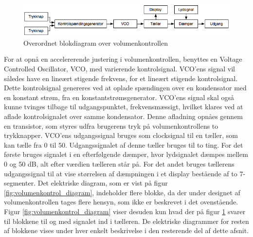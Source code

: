 \begin{figure}[h]
\centering
\includegraphics[scale=0.5]{teknisk/volumenkontrol/blokdiagram-volumenkontrol.png}
\caption{Overordnet blokdiagram over volumenkontrollen}
\label{fig:blokdiagram_volumenkontrol}
\end{figure}

For at opnå en accelererende justering i volumenkontrollen, benyttes en Voltage Controlled Oscillator, VCO, med varierende kontrolsignal. VCO'ens signal vil således have en lineært stigende frekvens, for et lineært stigende kontrolsignal. Dette kontrolsignal genereres ved at oplade spændingen over en kondensator med en konstant strøm, fra en konstantstrømsgenerator. VCO'ens signal skal også kunne tvinges tilbage til udgangspunktet, frekvensmæssigt, hvilket klares ved at aflade kontrolsignalet over samme kondensator. Denne afladning opnåes gennem en transistor, som styres udfra brugerens tryk på volumenkontrollens to trykknapper. VCO'ens udgangssignal bruges som clocksignal til en tæller, som kan tælle fra 0 til 50. Udgangssignalet af denne tæller bruges til to ting. For det første bruges signalet i en efterfølgende dæmper, hvor lydsignalet dæmpes mellem 0 og 50 dB, alt efter værdien tælleren står på. For det andet bruges tællerens udgangssignal til at vise størrelsen af dæmpningen i et display bestående af to 7-segmenter.
Det elektriske diagram, som er vist på figur \ref{fig:volumenkontrol_diagram}, indeholder flere blokke, da der under designet af volumenkontrollen tages flere hensyn, som ikke er beskrevet i det ovenstående. Figur \ref{fig:volumenkontrol_diagram} viser desuden kun hvad der på figur \ref{fig:blokdiagram_volumenkontrol} svarer til blokkene til og med signalet ind i tælleren. De elektriske diagrammer for resten af blokkene vises under hver enkelt beskrivelse i den resterende del af dette afsnit.
